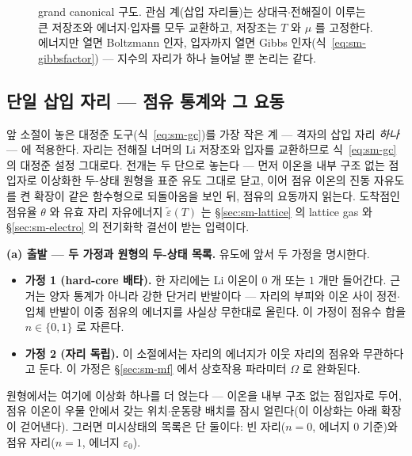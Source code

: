 \begin{figure}[t]
\centering
{}
\caption{grand canonical 구도. 관심 계(삽입 자리들)는 상대극$\cdot$전해질이 이루는 큰 저장조와
에너지$\cdot$입자를 모두 교환하고, 저장조는 $T$ 와 $\mu$ 를 고정한다. 에너지만 열면 Boltzmann 인자, 입자까지
열면 Gibbs 인자(식~\eqref{eq:sm-gibbsfactor}) --- 지수의 자리가 하나 늘어날 뿐 논리는 같다.}
\label{fig:sm-reservoir}
\end{figure}

\subsection{단일 삽입 자리 --- 점유 통계와 그 요동}\label{sec:sm-site}
앞 소절이 놓은 대정준 도구(식~\eqref{eq:sm-gc})를 가장 작은 계 --- 격자의 삽입 자리 \emph{하나} --- 에
적용한다. 자리는 전해질 너머의 Li 저장조와 입자를 교환하므로 식~\eqref{eq:sm-gc} 의 대정준 설정 그대로다.
전개는 두 단으로 놓는다 --- 먼저 이온을 내부 구조 없는 점입자로 이상화한 두-상태 원형을 표준 유도
그대로 닫고, 이어 점유 이온의 진동 자유도를 켠 확장이 같은 함수형으로 되돌아옴을 보인 뒤, 점유의
요동까지 읽는다. 도착점인 점유율 $\theta$ 와 유효 자리 자유에너지 $\tilde\varepsilon(T)$ 는
\S\ref{sec:sm-lattice} 의 lattice gas 와 \S\ref{sec:sm-electro} 의 전기화학 결선이 받는 입력이다.

\textbf{(a) 출발 --- 두 가정과 원형의 두-상태 목록.} 유도에 앞서 두 가정을 명시한다.
\begin{itemize}[leftmargin=2.2em,itemsep=0.1em]
\item \textbf{가정 1 (hard-core 배타).} 한 자리에는 Li 이온이 $0$ 개 또는 $1$ 개만 들어간다. 근거는 양자
통계가 아니라 강한 단거리 반발이다 --- 자리의 부피와 이온 사이 정전$\cdot$입체 반발이 이중 점유의
에너지를 사실상 무한대로 올린다. 이 가정이 점유수 합을 $n\in\{0,1\}$ 로 자른다.
\item \textbf{가정 2 (자리 독립).} 이 소절에서는 자리의 에너지가 이웃 자리의 점유와 무관하다고 둔다.
이 가정은 \S\ref{sec:sm-mf} 에서 상호작용 파라미터 $\Omega$ 로 완화된다.
\end{itemize}
원형에서는 여기에 이상화 하나를 더 얹는다 --- 이온을 내부 구조 없는 점입자로 두어, 점유 이온이 우물
안에서 갖는 위치$\cdot$운동량 배치를 잠시 얼린다(이 이상화는 아래 확장이 걷어낸다). 그러면 미시상태의
목록은 단 둘이다: 빈 자리($n=0$, 에너지 $0$ 기준)와 점유 자리($n=1$, 에너지 $\varepsilon_0$).

